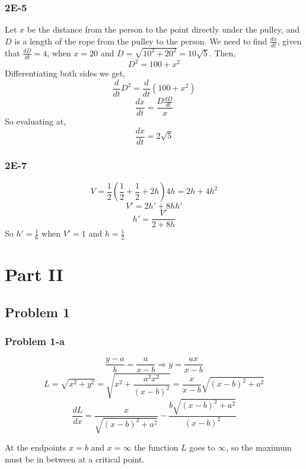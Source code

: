 \documentclass{article}
\begin{document}
\subsubsection{2E-5}
\begin{figure}[htp!]
    \centering
    
    \label{fig:fig5}
\end{figure}
Let $x$ be the distance from the person to the point directly under the pulley, and $D$ is a length of the rope from the pulley to the person. We need to find $\frac{dx}{dt}$, given that $\frac{dD}{dt} = 4$, when $x = 20$ and $D = \sqrt{10^2 + 20^2} = 10\sqrt{5}$. Then,
\[ D^2 = 100 + x^2 \]
Differentiating both sides we get,
\[ \frac{d}{dt} D^2 = \frac{d}{dt} \left( 100 + x^2 \right) \]
\[ \frac{dx}{dt} = \frac{D\frac{dD}{dt}}{x} \]
So evaluating at,
\[ \frac{dx}{dt} = 2\sqrt{5} \]

\subsubsection{2E-7}
\begin{figure}[htp!]
    \centering
    
    \label{fig:fig6}
\end{figure}
\[ V = \frac{1}{2} \left( \frac{1}{2} + \frac{1}{2} + 2h \right)4h = 2h + 4h^2 \]
\[ V' = 2h' + 8hh' \]
\[ h' = \frac{V'}{2+8h}\]
So $h' = \frac{1}{6}$ when $V' = 1$ and $h = \frac{1}{2}$

\section{Part II}
\subsection{Problem 1}
\subsubsection{Problem 1-a}
\begin{figure}[htp!]
    \centering
    
    \label{fig:fig7}
\end{figure}
\[ \frac{y-a}{b} = \frac{a}{x-b} \Rightarrow y = \frac{ax}{x-b} \]
\[ L = \sqrt{x^2 + y^2} = \sqrt{x^2 + \frac{a^2x^2}{(x-b)^2}} = \frac{x}{x-b}\sqrt{(x-b)^2+a^2}\]
\[ \frac{dL}{dx} =  \frac{x}{\sqrt{(x-b)^2+a^2}} -\frac{b\sqrt{(x-b)^2+a^2}}{(x-b)^2}\]

At the endpoints $x = b$ and $x = \infty$ the function $L$ goes to $\infty$, so the maximum must be in between at a critical point.
\end{document}

